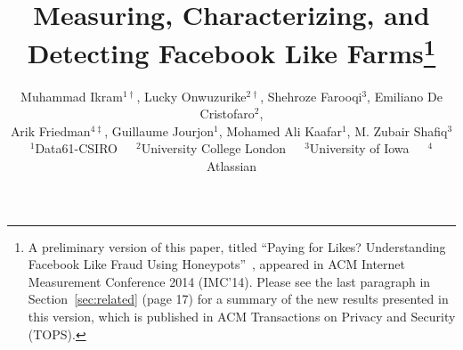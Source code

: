 \documentclass[twocolumn,10pt,letterpaper]{article}
\begin{document}
 

\title{\bf Measuring, Characterizing, and Detecting Facebook Like Farms\thanks{A preliminary version of this paper, titled ``Paying for Likes? Understanding Facebook Like Fraud Using Honeypots''~\cite{decristofaro14facebooklikefarms}, appeared in ACM Internet Measurement Conference 2014 (IMC'14). Please see the last paragraph in Section~\ref{sec:related} (page 17) for a summary of the new results presented in this version, which is published in ACM Transactions on Privacy and Security (TOPS).}}


\author{Muhammad Ikram$^{1\dag}$, Lucky Onwuzurike$^{2\dag}$, Shehroze Farooqi$^3$,
Emiliano De Cristofaro$^2$,\\ Arik Friedman$^{4\ddag}$, Guillaume Jourjon$^1$,
Mohamed Ali Kaafar$^1$, M. Zubair Shafiq$^3$\\[0.75ex]
\normalsize $^1$Data61-CSIRO $\;\;\;$ $^2$University College London $\;\;\;$ $^3$University of Iowa $\;\;\;$ $^4$Atlassian \vspace*{-1cm}}


%

\date{}
\maketitle


\renewcommand{\thefootnote}{\fnsymbol{footnote}}
\renewcommand{\thefootnote}{\arabic{footnote}}
\end{document}
